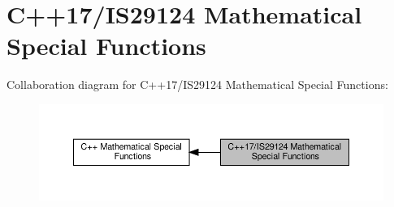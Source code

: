 \hypertarget{group__cxx17__math__spec__func}{}\section{C++17/\+I\+S29124 Mathematical Special Functions}
\label{group__cxx17__math__spec__func}
Collaboration diagram for C++17/\+I\+S29124 Mathematical Special Functions\+:
\nopagebreak
\begin{figure}[H]
\begin{center}
\leavevmode
\includegraphics[width=350pt]{group__cxx17__math__spec__func}
\end{center}
\end{figure}

